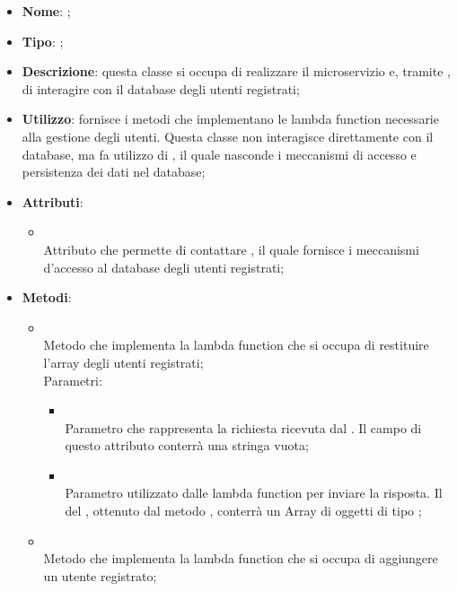 \begin{itemize}
	\item \textbf{Nome}: ;
	\item \textbf{Tipo}: ;
	\item \textbf{Descrizione}: questa classe si occupa di realizzare il microservizio  e, tramite , di interagire con il database degli utenti registrati;
	\item \textbf{Utilizzo}: fornisce i metodi che implementano le lambda function necessarie alla gestione degli utenti.
Questa classe non interagisce direttamente con il database, ma fa utilizzo di , il quale nasconde i meccanismi di accesso e persistenza dei dati nel database;
	\item \textbf{Attributi}:
	\begin{itemize}
		\item[]  \\
		Attributo che permette di contattare , il quale fornisce i meccanismi d'accesso al database degli utenti registrati;
	\end{itemize}
	\item \textbf{Metodi}:
	\begin{itemize}
		\item[]  \\
		Metodo che implementa la lambda function che si occupa di restituire l'array degli utenti registrati;\\
		Parametri:
		\begin{itemize}
			\item {} \\
			Parametro che rappresenta la richiesta ricevuta dal . Il campo  di questo attributo conterrà una stringa vuota;
			\item {} \\
			Parametro utilizzato dalle lambda function per inviare la risposta. Il  del , ottenuto dal metodo , conterrà un Array di oggetti di tipo ;
		\end{itemize}
		\item[]  \\
		Metodo che implementa la lambda function che si occupa di aggiungere un utente registrato;\\

\end{itemize}
\end{itemize}
